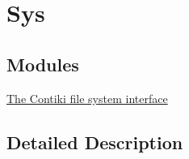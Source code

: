 \hypertarget{group__sys}{}\section{Sys}
\label{group__sys}
\subsection*{Modules}
\begin{DoxyCompactItemize}
\item 
\hyperlink{group__cfs}{The Contiki file system interface}
\end{DoxyCompactItemize}


\subsection{Detailed Description}
